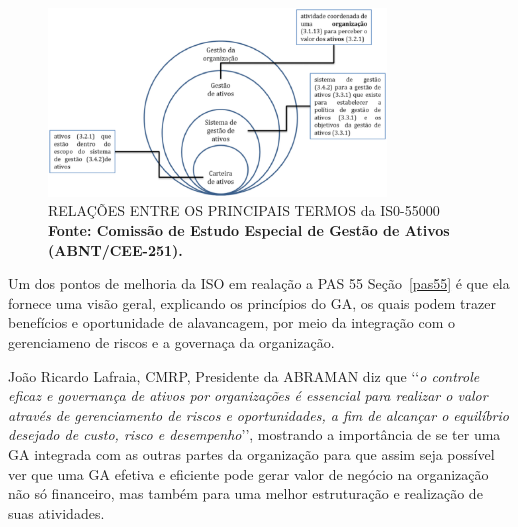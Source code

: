 \graphicspath{{figuras/}}
\begin{figure}[h]
\centering
\includegraphics[width=0.8\textwidth]{termos_iso_55000.eps}
\caption{RELAÇÕES ENTRE OS PRINCIPAIS TERMOS da IS0-55000 \textbf{Fonte: Comissão de Estudo Especial de
Gestão de Ativos (ABNT/CEE-251).}}
\label{termos_iso_55000}
\end{figure}

Um dos pontos de melhoria da ISO em realação a PAS 55 Seção~\ref{pas55} é que ela fornece uma visão geral, explicando os princípios do GA, os quais podem trazer benefícios e oportunidade de alavancagem, por meio da integração com o gerenciameno de riscos e a governaça da organização. 

João Ricardo Lafraia, CMRP, Presidente da ABRAMAN diz que \lq\lq \emph{o controle eficaz e governança de ativos por organizações é essencial para realizar o valor através de gerenciamento de riscos e oportunidades, a fim de alcançar o equilíbrio desejado de custo, risco e desempenho}\rq\rq, mostrando a importância de se ter uma GA integrada com as outras partes da organização para que assim seja possível ver que uma GA efetiva e eficiente pode gerar valor de negócio na organização não só financeiro, mas também para uma melhor estruturação e realização de suas atividades.


